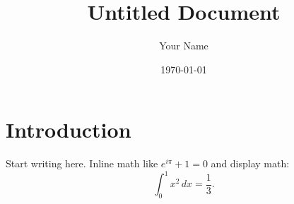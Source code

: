 \documentclass[11pt]{article}
\title{Untitled Document}
\author{Your Name}
\date{\today}
\begin{document}
\maketitle

\section{Introduction}
Start writing here. Inline math like $e^{i\pi} + 1 = 0$ and display math:
\begin{equation}
  \int_0^1 x^2\,dx = \frac{1}{3}.
\end{equation}
\end{document}
